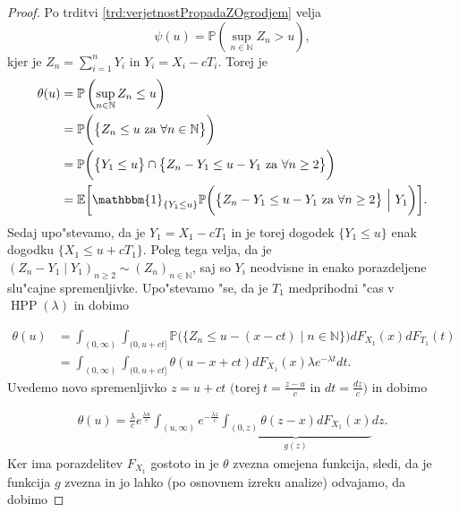 \documentclass[12pt, a4paper, reqno]{amsart}
\theoremstyle{definition}
\theoremstyle{plain}
\newcommand{\N}{\mathbb{N}}
\newcommand{\E}{\mathbb{E}}
\newcommand{\Prob}{\mathbb{P}}
\newcommand{\1}{\mathds{1}}
\DeclareMathOperator{\HPP}{HPP}
\begin{document}
    \begin{proof}
        Po trditvi \ref{trd:verjetnostPropadaZOgrodjem} velja
        \begin{equation*}
            \psi(u) = \Prob\left(\sup_{n\in\N}Z_n > u\right),
        \end{equation*}
        kjer je $Z_n = \sum_{i=1}^nY_i$ in $Y_i = X_i - cT_i$. Torej je
        \begin{align*}
            \theta(u) &= \Prob\left(\sup_{n\in\N}Z_n \leq u\right) \\
                      &= \Prob\biggl(\bigl\{Z_n \leq u \ \text{za} \ \forall n\in\N\bigr\}\biggr) \\
                      &= \Prob\biggl(\bigl\{Y_1 \leq u\bigr\}\cap \bigl\{Z_n - Y_1 \leq u - Y_1 \ \text{za} \ \forall n\geq2\bigr\}\biggr) \\
                      &= \E\biggl[\mathbbm{1}_{\{Y_1\leq u\}}\Prob\biggl(\bigl\{Z_n - Y_1 \leq u - Y_1 \ \text{za} \ \forall n\geq2\bigr\} \ \Big| \ Y_1\biggr)\biggr].
        \end{align*}
        Sedaj upo"stevamo, da je $Y_1 = X_1 - cT_1$ in je torej dogodek $\{Y_1 \leq u\}$ 
        enak dogodku $\{X_1 \leq u + cT_1\}$. Poleg tega velja, da je 
        $(Z_n - Y_1\mid Y_1)_{n\geq2} \sim (Z_n)_{n\in\N}$, saj so $Y_i$ neodvisne in enako porazdeljene
        slu"cajne spremenljivke.
        Upo"stevamo "se, da je  $T_1$ medprihodni "cas v $\HPP(\lambda)$ in dobimo

        \begin{align*}
                \theta(u)   &= \int_{(0, \infty)}\int_{(0, u + ct]}\Prob\biggl(\bigl\{Z_n \leq u - (x - ct)\mid n\in\N\bigr\}\biggr)dF_{X_1}(x)dF_{T_1}(t) \\
                            &= \int_{(0, \infty)}\int_{(0, u + ct]}\theta(u - x + ct)dF_{X_1}(x)\lambda e^{-\lambda t}dt.
        \end{align*}
        Uvedemo novo spremenljivko $z = u + ct$ $\bigl( \text{torej} \ t = \tfrac{z - u}{c}$ in $dt = \tfrac{dz}{c} \bigr)$ 
        in dobimo

        \begin{align*}
                    \theta(u) = \frac{\lambda}{c}e^{\frac{\lambda u}{c}}\int_{(u, \infty)}e^{-\frac{\lambda z}{c}}\underbrace{\int_{(0, z)}\theta(z - x)dF_{X_1}(x)}_{g(z)}dz.
        \end{align*}
        Ker ima porazdelitev $F_{X_1}$ gostoto in je $\theta$ zvezna omejena funkcija,
        sledi, da je funkcija $g$ zvezna in jo lahko (po osnovnem izreku analize)
        odvajamo, da dobimo


\end{proof}
\end{document}
